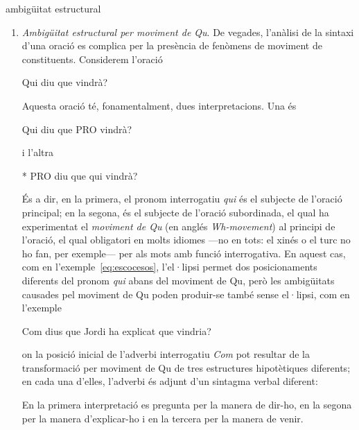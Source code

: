 \begin{persabermes}{ambigüitat estructural}
\begin{enumerate}
  \item \emph{Ambigüitat estructural per moviment de Qu}. De vegades,
    l'anàlisi de la sintaxi d'una oració es complica per la presència
    de fenòmens de moviment de constituents. Considerem l'oració
    \begin{example}
      Qui diu que vindrà?
    \end{example}
    Aquesta oració té, fonamentalment, dues interpretacions. Una és
    \begin{example}
      Qui diu que PRO vindrà?
    \end{example}
   i l'altra
  \begin{example}
    * PRO diu que qui vindrà?
  \end{example}
  És a dir, en la primera, el pronom interrogatiu \emph{qui} és el
  subjecte de l'oració principal; en la segona, és el subjecte de
  l'oració subordinada, el qual ha experimentat el \emph{moviment de
    Qu} (en anglés \emph{Wh-movement}) al principi de l'oració, el
  qual obligatori en molts idiomes ---no en tots: el xinés o el turc
  no ho fan, per exemple--- per als mots amb funció interrogativa. En
  aquest cas, com en l'exemple~\ref{eq:escocesos}, l'el·lipsi permet
  dos posicionaments diferents del pronom \emph{qui} abans del
  moviment de Qu, però les ambigüitats causades pel moviment de Qu
  poden produir-se també sense el·lipsi, com en l'exemple
  \begin{exemple}
    Com dius que Jordi ha explicat que vindria?
  \end{exemple}
    on la posició inicial de l'adverbi interrogatiu \emph{Com}
  pot resultar de la transformació per moviment de Qu de tres
  estructures hipotètiques diferents; en cada una d'elles, l'adverbi
  és adjunt d'un sintagma verbal diferent:
  En la primera interpretació es pregunta per la manera de dir-ho, en
  la segona per la manera d'explicar-ho i en la tercera per la manera
  de venir.
  

\end{enumerate}
\end{persabermes}
